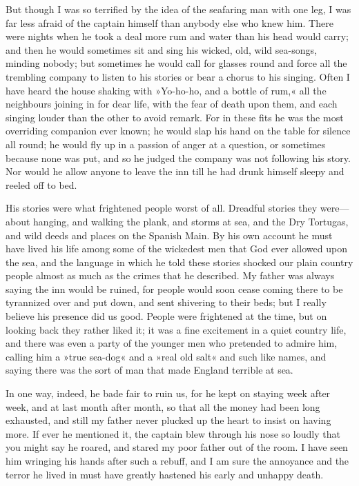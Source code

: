 But though I was so terrified by the idea of the seafaring man with one leg, I was far less afraid of the captain himself than anybody else who knew him. There were nights when he took a deal more rum and water than his head would carry; and then he would sometimes sit and sing his wicked, old, wild sea-songs, minding nobody; but sometimes he would call for glasses round and force all the trembling company to listen to his stories or bear a chorus to his singing. Often I have heard the house shaking with »Yo-ho-ho, and a bottle of rum,« all the neighbours joining in for dear life, with the fear of death upon them, and each singing louder than the other to avoid remark. For in these fits he was the most overriding companion ever known; he would slap his hand on the table for silence all round; he would fly up in a passion of anger at a question, or sometimes because none was put, and so he judged the company was not following his story. Nor would he allow anyone to leave the inn till he had drunk himself sleepy and reeled off to bed.

His stories were what frightened people worst of all. Dreadful stories they were---about hanging, and walking the plank, and storms at sea, and the Dry Tortugas, and wild deeds and places on the Spanish Main. By his own account he must have lived his life among some of the wickedest men that God ever allowed upon the sea, and the language in which he told these stories shocked our plain country people almost as much as the crimes that he described. My father was always saying the inn would be ruined, for people would soon cease coming there to be tyrannized over and put down, and sent shivering to their beds; but I really believe his presence did us good. People were frightened at the time, but on looking back they rather liked it; it was a fine excitement in a quiet country life, and there was even a party of the younger men who pretended to admire him, calling him a »true sea-dog« and a »real old salt« and such like names, and saying there was the sort of man that made England terrible at sea.

In one way, indeed, he bade fair to ruin us, for he kept on staying week after week, and at last month after month, so that all the money had been long exhausted, and still my father never plucked up the heart to insist on having more. If ever he mentioned it, the captain blew through his nose so loudly that you might say he roared, and stared my poor father out of the room. I have seen him wringing his hands after such a rebuff, and I am sure the annoyance and the terror he lived in must have greatly hastened his early and unhappy death.

